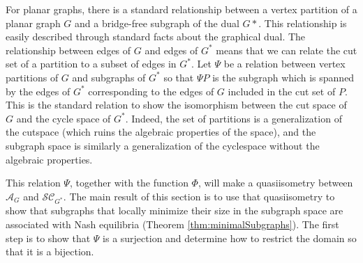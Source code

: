 \documentclass{article}
\begin{document}
For planar graphs, there is a standard relationship between a vertex partition of a planar graph $G$ and a bridge-free subgraph of the dual $G*$. This relationship is easily described through standard facts about the graphical dual. The relationship between edges of $G$ and edges of $G^*$ means that we can relate the cut set of a partition to a subset of edges in $G^*$. Let $\Psi$ be a relation between vertex partitions of $G$ and subgraphs of $G^*$ so that $\Psi P$ is the subgraph which is spanned by the edges of $G^*$ corresponding to the edges of $G$ included in the cut set of $P$. This is the standard relation to show the isomorphism between the cut space of $G$ and the cycle space of $G^*$. Indeed, the set of partitions is a generalization of the cutspace (which ruins the algebraic properties of the space), and the subgraph space is similarly a generalization of the cyclespace without the algebraic properties. 

This relation $\Psi$, together with the function $\Phi$, will make a quasiisometry between $\mathcal{A}_G$ and $\mathcal{SC}_{G^*}$. The main result of this section is to use that quasiisometry to show that subgraphs that locally minimize their size in the subgraph space are associated with Nash equilibria (Theorem \ref{thm:minimalSubgraphs}). The first step is to show that $\Psi$ is a surjection and determine how to restrict the domain so that it is a bijection.
\end{document}
